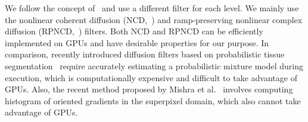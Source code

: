 We follow the concept of~\cite{kang_new_2016} and use a different filter for each level.
We mainly use the nonlinear coherent diffusion (NCD,~\cite{abd-elmoniem_realtime_2002}) and ramp-preserving nonlinear complex diffusion (RPNCD,~\cite{gilboa_image_2004}) filters.
Both NCD and RPNCD can be efficiently implemented on GPUs and have desirable properties for our purpose.
In comparison, recently introduced diffusion filters based on probabilistic tissue segmentation~\cite{vegas-sanchez-ferrero_probabilisticdriven_2010, ramos-llorden_anisotropic_2015} require accurately estimating a probabilistic mixture model during execution, which is computationally expensive and difficult to take advantage of GPUs.
Also, the recent method proposed by Mishra et al.~\cite{mishra_edge_2018} involves computing histogram of oriented gradients in the superpixel domain, which also cannot take advantage of GPUs.
%
